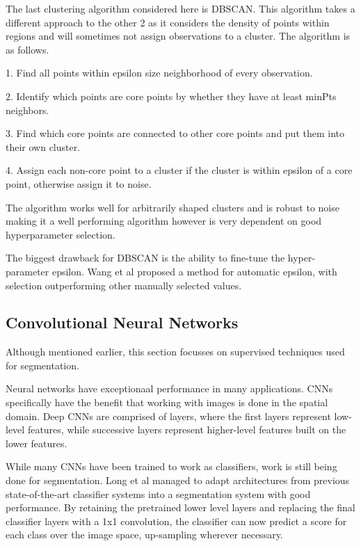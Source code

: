 \documentclass[a4]{article}
\begin{document}
The last clustering algorithm considered here is DBSCAN. This algorithm takes a different approach to the other 2 as it considers the density of points within regions and will sometimes not assign observations to a cluster. The algorithm is as follows. 


1. Find all points within epsilon size neighborhood of every observation. 

2. Identify which points are core points by whether they have at least minPts neighbors. 

3. Find which core points are connected to other core points and put them into their own cluster. 

4. Assign each non-core point to a cluster if the cluster is within epsilon of a core point, otherwise assign it to noise. 

  

The algorithm works well for arbitrarily shaped clusters and is robust to noise making it a well performing algorithm \cite{kurumalla2016k} however is very dependent on good hyperparameter selection. 

 

The biggest drawback for DBSCAN is the ability to fine-tune the hyper-parameter epsilon. Wang et al \cite{wang2019improved} proposed a method for automatic epsilon, with selection outperforming other manually selected values.

 


\subsection*{Convolutional Neural Networks}
Although mentioned earlier, this section focusses on supervised techniques used for segmentation.

Neural networks have exceptionaal performance in many applications. CNNs specifically have the benefit that working with images is done in the spatial domain. Deep CNNs are comprised of layers, where the first layers represent low-level features, while successive layers represent higher-level features built on the lower features. 


While many CNNs have been trained to work as classifiers, work is still being done for segmentation. Long et al \cite{long2015fully} managed to adapt architectures from previous state-of-the-art classifier systems into a segmentation system with good performance. By retaining the pretrained lower level layers and replacing the final classifier layers with a 1x1 convolution, the classifier can now predict a score for each class over the image space, up-sampling wherever necessary.   
\end{document}
